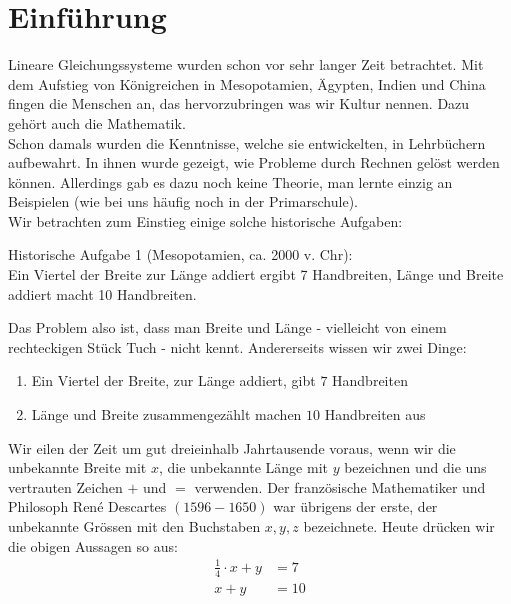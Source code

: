 \documentclass[11pt,oneside]{article}
\begin{document}
\section*{Einführung}
	Lineare Gleichungssysteme wurden schon vor sehr langer Zeit betrachtet. Mit dem Aufstieg von Königreichen in Mesopotamien, Ägypten, Indien und China fingen die Menschen an, das hervorzubringen was wir Kultur nennen. Dazu gehört auch die Mathematik.\\
	Schon damals wurden die Kenntnisse, welche sie entwickelten, in Lehrbüchern aufbewahrt. In ihnen wurde gezeigt, wie Probleme durch Rechnen gelöst werden können. Allerdings gab es dazu noch keine Theorie, man lernte einzig an Beispielen (wie bei uns häufig noch in der Primarschule).\\
	Wir betrachten zum Einstieg einige solche historische Aufgaben:
	\begin{center}
		\begin{framed}
			Historische Aufgabe 1 (Mesopotamien, ca. 2000 v. Chr):\\
			\glqq Ein Viertel der Breite zur Länge addiert ergibt 7 Handbreiten, Länge und Breite addiert macht 10 Handbreiten\grqq.
		\end{framed}
	\end{center}
	Das Problem also ist, dass man Breite und Länge - vielleicht von einem rechteckigen Stück Tuch - nicht kennt. Andererseits wissen wir zwei Dinge:
	\begin{enumerate}[label=\alph*)]
		\item Ein Viertel der Breite, zur Länge addiert, gibt $7$ Handbreiten
		\item Länge und Breite zusammengezählt machen $10$ Handbreiten aus
	\end{enumerate}
	Wir eilen der Zeit um gut dreieinhalb Jahrtausende voraus, wenn wir die unbekannte Breite mit $x$, die unbekannte Länge mit $y$ bezeichnen und die uns vertrauten Zeichen $+$ und $=$ verwenden. Der französische Mathematiker und Philosoph René Descartes $\left(1596-1650\right)$ war übrigens der erste, der unbekannte Grössen mit den Buchstaben $x,y,z$ bezeichnete. Heute drücken wir die obigen Aussagen so aus:
	\begin{align*}
		\frac{1}{4}\cdot x + y &= 7 \\
		x + y &= 10
	\end{align*}
\end{document}
